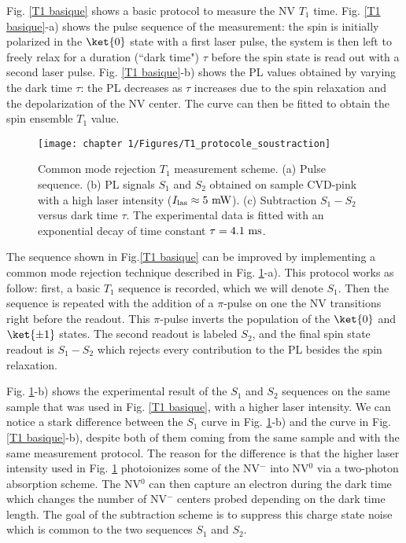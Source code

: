 \documentclass[a4paper, 11pt]{report}
\begin{document}
Fig. \ref{T1 basique} shows a basic protocol to measure the NV $T_1$ time. Fig. \ref{T1 basique}-a) shows the pulse sequence of the measurement: the spin is initially polarized in the $\ket{0}$ state with a first laser pulse, the system is then left to freely relax for a duration (``dark time") $\tau$ before the spin state is read out with a second laser pulse. Fig. \ref{T1 basique}-b) shows the PL values obtained by varying the dark time $\tau$: the PL decreases as $\tau$ increases due to the spin relaxation and the depolarization of the NV center. The curve can then be fitted to obtain the spin ensemble $T_1$ value.

\begin{figure}[h!]
\centering
\texttt{[image: chapter 1/Figures/T1\_protocole\_soustraction]}
\caption{Common mode rejection $T_1$ measurement scheme. (a) Pulse sequence. (b) PL signals $S_1$ and $S_2$ obtained on sample CVD-pink with a high laser intensity ($I_{\rm las}\approx 5\ \rm mW$). (c) Subtraction $S_1-S_2$ versus dark time $\tau$. The experimental data is fitted with an exponential decay of time constant $\tau=4.1\ \rm ms$.}
\label{T1 soustraction}
\end{figure}

The sequence shown in Fig.\ref{T1 basique} can be improved by implementing a common mode rejection technique described in Fig. \ref{T1 soustraction}-a). This protocol works as follow: first, a basic $T_1$ sequence is recorded, which we will denote $S_1$. Then the sequence is repeated with the addition of a $\pi$-pulse on one the NV transitions right before the readout. This $\pi$-pulse inverts the population of the $\ket{0}$ and $\ket{\pm 1}$ states. The second readout is labeled $S_2$, and the final spin state readout is $S_1 -S_2$ which rejects every contribution to the PL besides the spin relaxation. 

Fig. \ref{T1 soustraction}-b) shows the experimental result of the $S_1$ and $S_2$ sequences on the same sample that was used in Fig. \ref{T1 basique}, with a higher laser intensity. We can notice a stark difference between the $S_1$ curve in Fig. \ref{T1 soustraction}-b) and the curve in Fig. \ref{T1 basique}-b), despite both of them coming from the same sample and with the same measurement protocol. The reason for the difference is that the higher laser intensity used in Fig. \ref{T1 soustraction} photoionizes some of the NV$^-$ into NV$^0$ via a two-photon absorption scheme. The NV$^0$ can then capture an electron during the dark time \citep{giri2018coupled, giri2019selective} which changes the number of NV$^-$ centers probed depending on the dark time length. The goal of the subtraction scheme is to suppress this charge state noise which is common to the two sequences $S_1$ and $S_2$.
\end{document}
